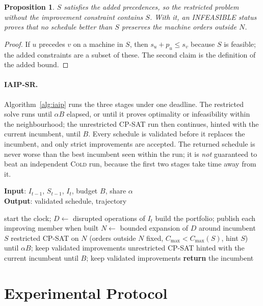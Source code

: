 \documentclass[letterpaper]{article} %
\newtheorem{proposition}{Proposition}
\newcommand{\mcold}{\textsc{Cold}}
\newcommand{\miaip}{\textsc{IAIP-SR}}
\begin{document}
\begin{proposition}
$S$ satisfies the added precedences, so the restricted problem without the improvement constraint contains $S$. With it, an INFEASIBLE status proves that no schedule better than $S$ preserves the machine orders outside $N$.
\end{proposition}
\begin{proof}
If $u$ precedes $v$ on a machine in $S$, then $s_u+p_u\le s_v$ because $S$ is feasible; the added constraints are a subset of these. The second claim is the definition of the added bound.
\end{proof}

\paragraph{\miaip.} Algorithm~\ref{alg:iaip} runs the three stages under one deadline. The restricted solve runs until $\alpha B$ elapsed, or until it proves optimality or infeasibility within the neighbourhood; the unrestricted CP-SAT run then continues, hinted with the current incumbent, until $B$. Every schedule is validated before it replaces the incumbent, and only strict improvements are accepted. The returned schedule is never worse than the best incumbent seen within the run; it is \emph{not} guaranteed to beat an independent \mcold{} run, because the first two stages take time away from it.

\begin{algorithm}[tb]
\caption{\miaip{} under a single deadline $B$}
\label{alg:iaip}
\textbf{Input}: $I_{t-1}$, $S_{t-1}$, $I_t$, budget $B$, share $\alpha$\hfill\\
\textbf{Output}: validated schedule, trajectory
\begin{algorithmic}[1]
\STATE start the clock; $D\leftarrow$ disrupted operations of $I_t$
\STATE build the portfolio; publish each improving member when built
\STATE $N\leftarrow$ bounded expansion of $D$ around incumbent $S$
\STATE restricted CP-SAT on $N$ (orders outside $N$ fixed, $C_{\max}<C_{\max}(S)$, hint $S$) until $\alpha B$; keep validated improvements
\STATE unrestricted CP-SAT hinted with the current incumbent until $B$; keep validated improvements
\STATE \textbf{return} the incumbent
\end{algorithmic}
\end{algorithm}

\section{Experimental Protocol}
\end{document}
